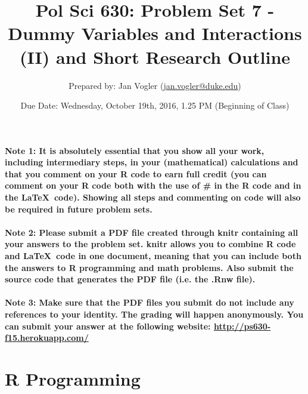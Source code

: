 \documentclass[12pt]{article}
\begin{document}
\title{Pol Sci 630: Problem Set 7 - Dummy Variables and Interactions (II) and Short Research Outline}

\author{Prepared by: Jan Vogler (\href{mailto:jan.vogler@duke.edu}{jan.vogler@duke.edu})}

\date{Due Date: Wednesday, October 19th, 2016, 1.25 PM (Beginning of Class)}
 
\maketitle 

\section*{}

\paragraph{Note 1: It is absolutely essential that you show all your work, including intermediary steps, in your (mathematical) calculations and that you comment on your R code to earn full credit (you can comment on your R code both with the use of \# in the R code and in the \LaTeX \ code). Showing all steps and commenting on code will also be required in future problem sets.}

\paragraph{Note 2: Please submit a PDF file created through knitr containing all your answers to the problem set. knitr allows you to combine R code and \LaTeX \ code in one document, meaning that you can include both the answers to R programming and math problems. Also submit the source code that generates the PDF file (i.e. the .Rnw file).}

\paragraph{Note 3: Make sure that the PDF files you submit do not include any references to your identity. The grading will happen anonymously. You can submit your answer at the following website: \url{http://ps630-f15.herokuapp.com/}}




\section*{R Programming}
\end{document}
